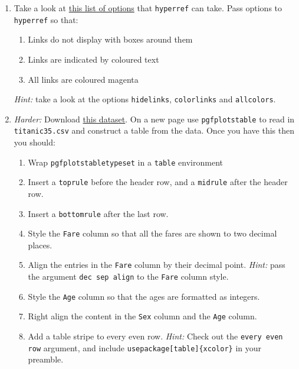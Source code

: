 \documentclass{article}
\begin{document}
\begin{enumerate}[label=\color{purple}\theenumi.]
  \item Take a look at
    \href{http://mirror.ox.ac.uk/sites/ctan.org/macros/latex/contrib/hyperref/doc/manual.pdf#page=10}
        {this list of options} that \texttt{hyperref} can take. Pass options to 
    \texttt{hyperref} so that:
    \begin{enumerate}[label=\color{purple}\roman*)]
      \item Links do not display with boxes around them
      \item Links are indicated by coloured text
      \item All links are coloured magenta
    \end{enumerate}
    \textsl{Hint:} take a look at the options \texttt{hidelinks},
    \texttt{colorlinks} and \texttt{allcolors}.

  \item \emph{Harder:} Download
    \href{https://jwalton.info/assets/teaching/latex/titanic.csv}%
    {this dataset}. On a new page use \texttt{pgfplotstable} to read in 
    \texttt{titanic35.csv} and construct a table from the data. Once you have
    this then you should:
    \begin{enumerate}[label=\color{purple}\roman*)]
      \item Wrap \texttt{pgfplotstabletypeset} in a \texttt{table} environment
      \item Insert a \texttt{toprule} before the header row, and a
        \texttt{midrule} after the header row.
      \item Insert a \texttt{bottomrule} after the last row.
      \item Style the \texttt{Fare} column so that all the fares are shown to
        two decimal places.
      \item Align the entries in the \texttt{Fare} column by their decimal
        point. \emph{Hint:} pass the argument \texttt{dec sep align} to the 
        \texttt{Fare} column style.
      \item Style the \texttt{Age} column so that the ages are formatted as
        integers.
      \item Right align the content in the \texttt{Sex} column and the
        \texttt{Age} column.
      \item Add a table stripe to every even row. \emph{Hint:} Check out the 
        \texttt{every even row} argument, and include 
        \texttt{\tb usepackage[table]\{xcolor\}} in your preamble.
    \end{enumerate}
\end{enumerate}
\end{document}
